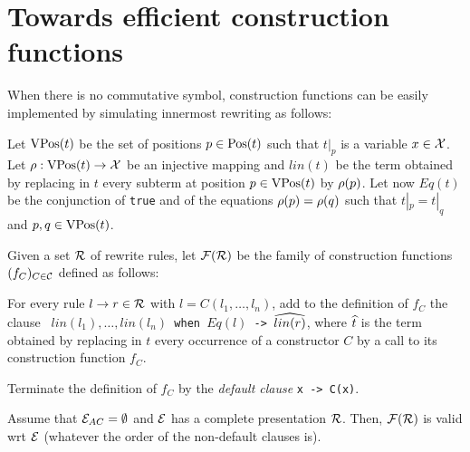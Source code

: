 
\section{Towards efficient construction functions}
\label{sec-genr}


When there is no commutative symbol, construction functions can be
easily implemented by simulating innermost rewriting as follows:

\begin{dfn}[Linearization]
Let $\mathrm{VPos}(t)$ be the set of positions $p\in\mathrm{Pos}(t)$ such that $t|_p$
is a variable $x\in\mathcal{X}$. Let $\rho:\mathrm{VPos}(t)\rightarrow\mathcal{X}$ be an injective
mapping and $lin(t)$ be the term obtained by replacing in $t$ every
subterm at position $p\in\mathrm{VPos}(t)$ by $\rho(p)$. Let now $Eq(t)$ be the
conjunction of {\tt true} and of the equations $\rho(p)=\rho(q)$ such that
$t|_p=t|_q$ and $p,q\in\mathrm{VPos}(t)$.
\end{dfn}

\begin{dfn}
\label{dfn-r}
Given a set $\mathcal{R}$ of rewrite rules, let $\mathcal{F}(\mathcal{R})$ be the family of
construction functions $(f_C)_{C\in\mathcal{C}}$ defined as follows:

\begin{lst}{\bu}
\item For every rule $l\rightarrow r\in\mathcal{R}$ with $l=C(l_1,\ldots,l_n)$,
add to the definition of $f_C$ the clause {\tt
$lin(l_1),\ldots,lin(l_n)$ when $Eq(l)$ -> ${\widehat{lin(r)}}$}, where
${\widehat{t}}$ is the term obtained by replacing in $t$ every occurrence of a
constructor $C$ by a call to its construction function $f_C$.
\item Terminate the definition of $f_C$ by the {\em default clause}
{\tt x -> C(x)}.
\end{lst}
\end{dfn}

\begin{thm}
\label{thm-1}
Assume that $\mathcal{E}_{AC}=\emptyset$ and $\mathcal{E}$ has a complete presentation
$\mathcal{R}$. Then, $\mathcal{F}(\mathcal{R})$ is valid wrt $\mathcal{E}$ (whatever the order of the
non-default clauses is).
\end{thm}

